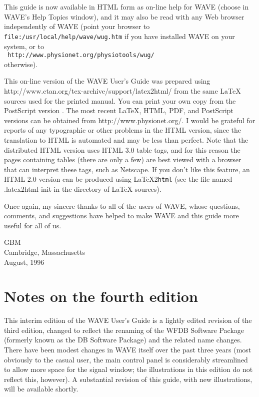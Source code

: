 \documentclass[twoside]{book}
\newcommand{\button}[1]{\cornersize{2}\ovalbox{\rule[-.3mm]{0cm}{2.5mm}\small\sf ~#1~}}
\newcommand{\WAVE}{{\sf WAVE}\xspace}
\begin{document}
\begin{latexonly}
This guide is now available in HTML form as on-line help for \WAVE{}
(choose \button{User's Guide} in \WAVE{}'s {\sf Help Topics} window),
and it may also be read with any Web browser independently of \WAVE{}
(point your browser to {\tt
file:\-/usr\-/local\-/help\-/wave\-/wug.htm} if you 
have installed \WAVE{} on your system, or to\\
{\tt
http://www.physionet.org\-/physiotools\-/wug/}\\
otherwise). 
\end{latexonly}
\begin{htmlonly}
This on-line version of the \WAVE{} User's Guide was prepared using
{http://www.ctan.org/tex-archive/support/latex2html/}
from the same \LaTeX{} sources used for the
printed manual.  You can print your own copy from the PostScript version
.  The most recent \LaTeX{}, HTML, PDF, and
PostScript versions can be obtained from
{http://www.physionet.org/}.
I would be grateful for reports of any typographic or other problems
in the HTML version, since the translation to HTML is automated and
may be less than perfect.  Note that the distributed HTML version uses
HTML 3.0 table tags, and for this reason the pages containing tables
(there are only a few) are best viewed with a browser that can
interpret these tags, such as Netscape.  If you don't like this
feature, an HTML 2.0 version can be produced using \LaTeX 2\texttt{html}
(see the file named {.latex2html-init} in the directory of \LaTeX{}
sources).
\end{htmlonly}

Once again, my sincere thanks to all of the users of \WAVE{}, whose questions,
comments, and suggestions have helped to make \WAVE{} and this guide
more useful for all of us.

\vspace{2em}
\noindent
GBM\\
Cambridge, Massachusetts\\
August, 1996

\section*{Notes on the fourth edition}

This interim edition of the \WAVE{} User's Guide is a lightly edited
revision of the third edition, changed to reflect the renaming of the
WFDB Software Package (formerly known as the DB Software Package) and
the related name changes.  There have been modest changes in \WAVE{}
itself over the past three years (most obviously to the casual user,
the main control panel is considerably streamlined to allow more space
for the signal window;  the illustrations in this edition do not
reflect this, however).  A substantial revision of this
guide, with new illustrations, will be available shortly.
\end{document}
